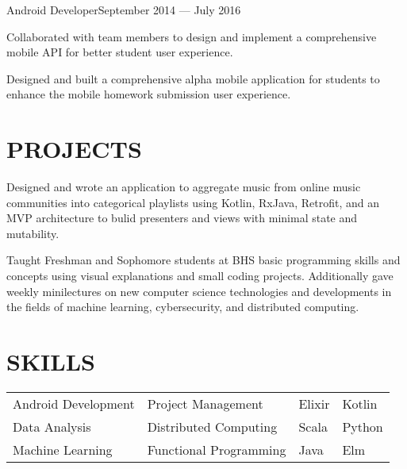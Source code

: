 \documentclass[10pt]{article}
\begin{document}
                  	 
                {Android Developer}{September 2014 --- July 2016}
                 			\begin{accomplishments}					        
                   			\item Collaborated with team members to design and implement a comprehensive mobile API for better student user experience.
                   			\item Designed and built a comprehensive alpha mobile application for students to enhance the mobile homework submission user experience.
                  		 \end{accomplishments}
                  		 
                  
\section*{PROJECTS}
                 {Designed and wrote an application to aggregate music from online music communities into categorical playlists using Kotlin, RxJava, Retrofit, and an MVP architecture to bulid presenters and views with minimal state and mutability.}
                
                {Taught Freshman and Sophomore students at BHS basic programming skills and concepts using visual explanations and small coding projects. Additionally gave weekly mini{\textendash}lectures on new computer science technologies and developments in the fields of machine learning, cybersecurity, and distributed computing.}

\section*{SKILLS}
				\setlength{\columnsep}{1pt}
				\begin{tabu}{X[2c]X[2c]X[c]X[c]}
					Android Development  & Project Management & Elixir& Kotlin \\
					Data Analysis 			   & Distributed Computing & Scala & Python \\
					Machine Learning		   & Functional Programming & Java & Elm \\
				\end{tabu}
 
\end{document}
